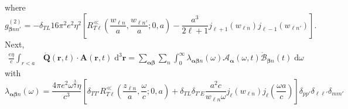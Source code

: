 \documentclass{article}
\begin{document}
where
\begin{equation}
g_{\bm{\beta}nn'}^{(2)} = -\delta_{TL}16\pi^2e^2\eta^2\left[R_{T\ell}^\ll\left(\frac{w_{\ell n}}{a},\frac{w_{\ell n'}}{a};0,a\right) - \frac{a^3}{2\ell + 1}j_{\ell + 1}(w_{\ell n})j_{\ell - 1}(w_{\ell n'})\right].
\end{equation}
Next,
\begin{equation}
\begin{split}
\frac{e\eta}{c}\int_{r<a}&\dot{\mathbf{Q}}(\mathbf{r},t)\cdot\mathbf{A}(\mathbf{r},t)\;\mathrm{d}^3\mathbf{r}
= \sum_{\bm{\alpha}\bm{\beta}}\sum_n\int_0^\infty\lambda_{\bm{\alpha}\bm{\beta}n}(\omega)\mathcal{A}_{\bm{\alpha}}(\omega,t)\dot{\mathcal{B}}_{\bm{\beta}n}(t)\;\mathrm{d}\omega
\end{split}
\end{equation}
with
\begin{equation}
\lambda_{\bm{\alpha}\bm{\beta}n}(\omega) = \frac{4\pi e^2\omega^\frac{3}{2}\eta}{c^3}\left[\delta_{TT'}R_{T\ell}^\ll\left(\frac{z_{\ell n}}{a},\frac{\omega}{c};0,a\right) + \delta_{TL}\delta_{T'E}\frac{a^2c}{w_{\ell n}\omega}j_\ell(w_{\ell n})j_{\ell}\left(\frac{\omega a}{c}\right)\right]\delta_{pp'}\delta_{\ell\ell'}\delta_{mm'}
\end{equation}
\end{document}
